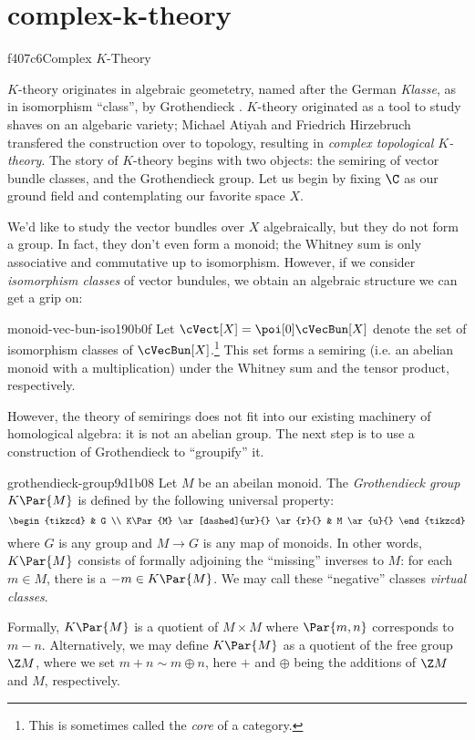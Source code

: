 \section{complex-k-theory}{f407c6}{Complex $K$-Theory}

$K$-theory originates in algebraic geometetry, named after the German \emph{Klasse}, as in
isomorphism ``class'', by Grothendieck \citeme{}. $K$-theory originated as a tool to study
shaves on an algebaric variety; Michael Atiyah and Friedrich Hirzebruch transfered 
the construction over to topology, resulting in \emph{complex topological $K$-theory}.
The story of $K$-theory begins with two objects: the semiring of vector bundle classes, and
the Grothendieck group. Let us begin by fixing $\C$ as our ground field and contemplating our
favorite space $X$. 

We'd like to study the vector bundles over $X$ algebraically, but they do not form a group.
In fact, they don't even form a monoid; the Whitney sum is only associative and commutative up
to isomorphism. However, if we consider \emph{isomorphism classes} of vector bundules, we
obtain an algebraic structure we can get a grip on:
\begin{defn}{monoid-vec-bun-iso}{190b0f} 
  Let $\cVect[X] = \poi[0] \cVecBun[X]$ denote the set of isomorphism classes of 
  $\cVecBun[X]$.\footnote{This is sometimes called the \emph{core} of a category.}
  This set forms a semiring (i.e. an abelian monoid with a multiplication) under the
  Whitney sum and the tensor product, respectively.
\end{defn}

However, the theory of semirings does not fit into our existing machinery of
homological algebra: it is not an abelian group. The next step is to use a construction
of Grothendieck to ``groupify'' it.
\begin{defn}{grothendieck-group}{9d1b08}
  Let $M$ be an abeilan monoid. The \emph{Grothendieck group} $K\Par{M}$ is defined by
  the following universal property:
  \[\begin{tikzcd}
    & G \\
    K\Par{M} \ar[dashed]{ur}{} \ar{r}{} & M \ar{u}{}
  \end{tikzcd}\]
  where $G$ is any group and $M \to G$ is any map of monoids. In other words, $K\Par{M}$
  consists of formally adjoining the ``missing'' inverses to $M$: for each $m\in M$, 
  there is a $-m\in K\Par{M}$. We may call these ``negative'' classes \emph{virtual classes}.  

  Formally, $K\Par{M}$ is a quotient of $M \times M$ where $\Par{m, n}$ corresponds to $m - n$. 
  Alternatively, we may define $K\Par{M}$ as a quotient of the free group ${\Z}M$, where we set
  $m + n \sim m \oplus n$, here $+$ and $\oplus$ being the additions of ${\Z}M$ and $M$,
  respectively.
\end{defn}


